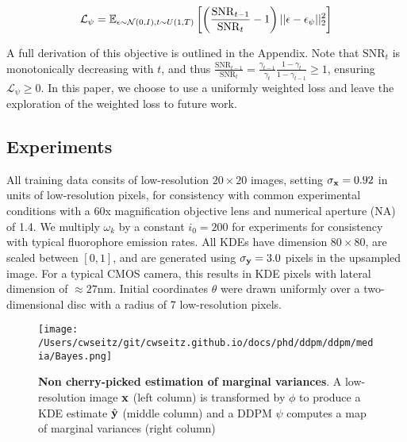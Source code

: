 \begin{equation}
\mathcal{L}_{\psi} = \mathbb{E}_{\epsilon\sim \mathcal{N}(0,I),t\sim U(1,T)}\left[\left(\frac{\mathrm{SNR}_{t-1}}{{\mathrm{SNR}_{t}}}-1\right)\lvert\lvert \bold{\epsilon}-\bold{\epsilon}_{\psi}\lvert\lvert_{2}^{2}\right]
\end{equation}

A full derivation of this objective is outlined in the Appendix. Note that $\mathrm{SNR}_{t}$ is monotonically decreasing with $t$, and thus $\frac{\mathrm{SNR}_{t-1}}{{\mathrm{SNR}_{t}}} = \frac{\gamma_{t-1}}{\gamma_{t}}\frac{1-\gamma_{t}}{1-\gamma_{t-1}} \geq 1$, ensuring $\mathcal{L}_{\psi}\geq 0$. In this paper, we choose to use a uniformly weighted loss and leave the exploration of the weighted loss to future work.

\subsection{Experiments}

All training data consits of low-resolution $20\times 20$ images, setting $\sigma_{\bold{x}}=0.92$ in units of low-resolution pixels, for consistency with common experimental conditions with a 60x magnification objective lens and numerical aperture (NA) of 1.4. We multiply $\omega_{k}$ by a constant $i_{0}=200$ for experiments for consistency with typical fluorophore emission rates. All KDEs have dimension $80\times 80$, are scaled between $[0,1]$, and are generated using $\sigma_{\bold{y}}=3.0$ pixels in the upsampled image. For a typical CMOS camera, this results in KDE pixels with lateral dimension of $\approx 27\mathrm{nm}$. Initial coordinates $\theta$ were drawn uniformly over a two-dimensional disc with a radius of 7 low-resolution pixels.


\begin{figure}
\centering
\texttt{[image: /Users/cwseitz/git/cwseitz.github.io/docs/phd/ddpm/ddpm/media/Bayes.png]}
\caption{\textbf{Non cherry-picked estimation of marginal variances}. A low-resolution image $\bold{x}$ (left column) is transformed by $\phi$ to produce a KDE estimate $\hat{\bold{y}}$ (middle column) and a DDPM $\psi$ computes a map of marginal variances (right column)}
\end{figure}

